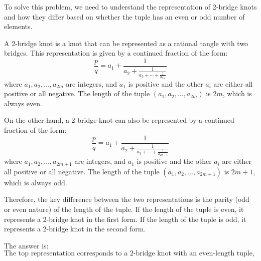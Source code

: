 To solve this problem, we need to understand the representation of 2-bridge knots and how they differ based on whether the tuple has an even or odd number of elements.

A 2-bridge knot is a knot that can be represented as a rational tangle with two bridges. This representation is given by a continued fraction of the form:
\[ \frac{p}{q} = a_1 + \frac{1}{a_2 + \frac{1}{a_3 + \cdots + \frac{1}{a_{2m}}}} \]
where \(a_1, a_2, \ldots, a_{2m}\) are integers, and \(a_1\) is positive and the other \(a_i\) are either all positive or all negative. The length of the tuple \( (a_1, a_2, \ldots, a_{2m}) \) is \(2m\), which is always even.

On the other hand, a 2-bridge knot can also be represented by a continued fraction of the form:
\[ \frac{p}{q} = a_1 + \frac{1}{a_2 + \frac{1}{a_3 + \cdots + \frac{1}{a_{2m+1}}}} \]
where \(a_1, a_2, \ldots, a_{2m+1}\) are integers, and \(a_1\) is positive and the other \(a_i\) are either all positive or all negative. The length of the tuple \( (a_1, a_2, \ldots, a_{2m+1}) \) is \(2m+1\), which is always odd.

Therefore, the key difference between the two representations is the parity (odd or even nature) of the length of the tuple. If the length of the tuple is even, it represents a 2-bridge knot in the first form. If the length of the tuple is odd, it represents a 2-bridge knot in the second form.

The answer is:
\[
\boxed{\text{The top representation corresponds to a 2-bridge knot with an even-length tuple, and the bottom representation corresponds to a 2-bridge knot with an odd-length tuple.}}
\]